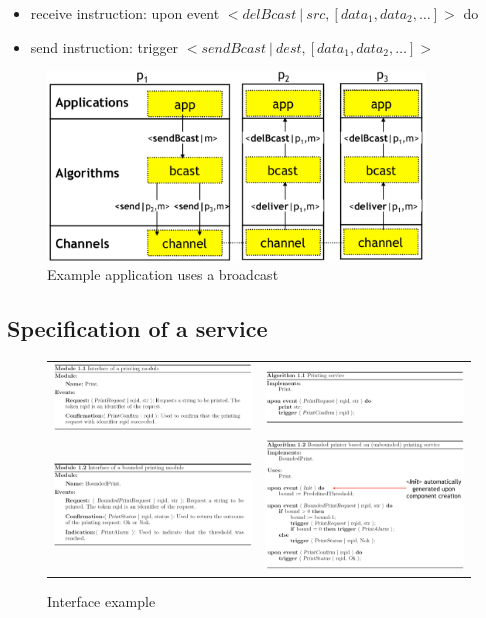 \begin{itemize}
    \item receive instruction:  upon event $<delBcast\ |\ src, [data_1,
        data_2,\ldots] >$ do
    \item send instruction:
        trigger $<sendBcast\ |\ dest, [data_1, data_2,\ldots]>$
\end{itemize}

\begin{figure}[!ht]
    \centering
    \includegraphics[width=10cm]{img/ex_broadcast.png}
    \caption{Example application uses a broadcast}
\end{figure}
\FloatBarrier{}

\subsection{Specification of a service}

\begin{figure}[!ht]
    \begin{tabular}{cc}
        \includegraphics[width=0.45\linewidth]{img/ex_inter1.png} &
        \includegraphics[width=0.45\linewidth]{img/ex_inter2.png} \\
        \includegraphics[width=0.45\linewidth]{img/ex_inter3.png} &
        \includegraphics[width=0.45\linewidth]{img/ex_inter4.png}
    \end{tabular}
    \caption{Interface example}
\end{figure}
\FloatBarrier{}


